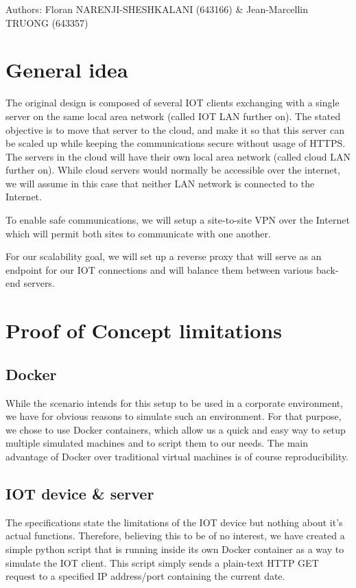 \documentclass[paper=a4, fontsize=11pt]{scrartcl}
\author{Floran NARENJI-SHESHKALANI \& Jean-Marcellin TRUONG}
\begin{document}
Authors: Floran NARENJI-SHESHKALANI (643166) \& Jean-Marcellin TRUONG (643357)

\section{General idea}

The original design is composed of several IOT clients exchanging with a single
server on the same local area network (called IOT LAN further on).
The stated objective is to move that server to the cloud, and make it so that
this server can be scaled up while keeping the communications secure without
usage of HTTPS\@.
The servers in the cloud will have their own local area network (called cloud
LAN further on).
While cloud servers would normally be accessible over the internet, we will
assume in this case that neither LAN network is connected to the Internet.

To enable safe communications, we will setup a site-to-site VPN over the
Internet which will permit both sites to communicate with one another.

For our scalability goal, we will set up a reverse proxy that will serve as an
endpoint for our IOT connections and will balance them between various back-end
servers.

\section{Proof of Concept limitations}

\subsection{Docker}

While the scenario intends for this setup to be used in a corporate environment,
we have for obvious reasons to simulate such an environment.
For that purpose, we chose to use Docker containers, which allow us a quick and
easy way to setup multiple simulated machines and to script them to our needs.
The main advantage of Docker over traditional virtual machines is of course
reproducibility.

\subsection{IOT device \& server}

The specifications state the limitations of the IOT device but nothing about
it's actual functions.
Therefore, believing this to be of no interest, we have created a simple python
script that is running inside its own Docker container as a way to simulate the
IOT client.
This script simply sends a plain-text HTTP GET request to a specified IP
address/port containing the current date.
\end{document}
